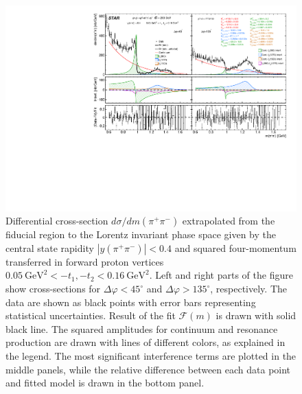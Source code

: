 \begin{figure}%
\centering
\includegraphics[width=\textwidth,page=1]{graphics/physicsResults/InvMassFit/RatioAndInterference_PiPiInvMass_Fit.pdf}
%
\caption[Differential cross-section $d\sigma/dm(\pi^{+}\pi^{-})$ extrapolated from the fiducial region to the Lorentz invariant phase space given by the central state rapidity $|y(\pi^{+}\pi^{-})|<0.4$ and squared four-momentum transferred in forward proton vertices $0.05~\text{GeV}^{2} < -t_{1}, -t_{2} < 0.16~\text{GeV}^{2}$]{Differential cross-section $d\sigma/dm(\pi^{+}\pi^{-})$ extrapolated from the fiducial region to the Lorentz invariant phase space given by the central state rapidity $|y(\pi^{+}\pi^{-})|<0.4$ and squared four-momentum transferred in forward proton vertices $0.05~\text{GeV}^{2} < -t_{1}, -t_{2} < 0.16~\text{GeV}^{2}$. Left and right parts of the figure show cross-sections for $\Delta\varphi<45^\circ$ and $\Delta\varphi>135^\circ$, respectively. The data are shown as black points with error bars representing statistical uncertainties. Result of the fit $\mathcal{F}(m)$ is drawn with solid black line. The squared amplitudes for continuum and resonance production are drawn with lines of different colors, as explained in the legend. The most significant interference terms are plotted in the middle panels, while the relative difference between each data point and fitted model is drawn in the bottom panel.}
\label{invMassFit}
\end{figure}


